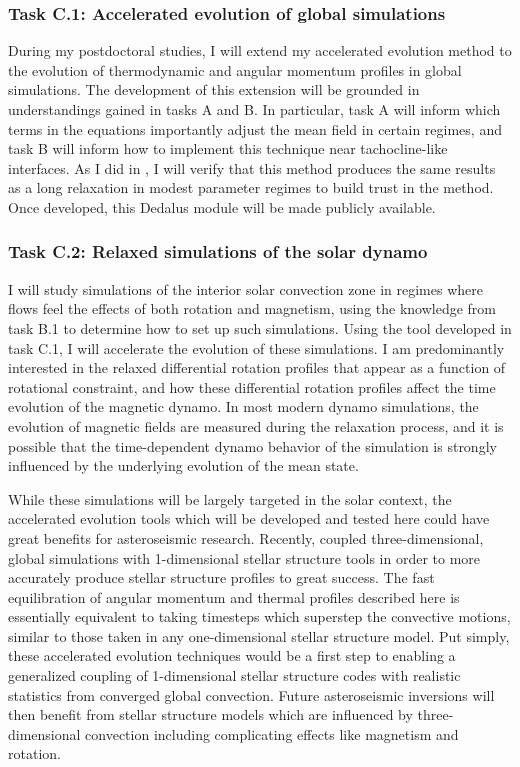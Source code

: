 \documentclass[aasms,11pt]{article}
\begin{document}
\subsubsection{Task C.1: Accelerated evolution of global simulations}
\label{sct:taskC1}
During my postdoctoral studies, I will extend my accelerated evolution method to the evolution of thermodynamic and angular momentum profiles in global simulations.
The development of this extension will be grounded in understandings gained in tasks A and B.
In particular, task A will inform which terms in the equations importantly adjust the mean field in certain regimes, and task B will inform how to implement this technique near tachocline-like interfaces.
As I did in \citet{anders&all2018}, I will verify that this method produces the same results as a long relaxation in modest parameter regimes to build trust in the method.
Once developed, this Dedalus module will be made publicly available.

\subsubsection{Task C.2: Relaxed simulations of the solar dynamo}
\label{sct:taskC2}
I will study simulations of the interior solar convection zone in regimes where flows feel the effects of both rotation and magnetism, using the knowledge from task B.1 to determine how to set up such simulations.
Using the tool developed in task C.1, I will accelerate the evolution of these simulations.
I am predominantly interested in the relaxed differential rotation profiles that appear as a function of rotational constraint, and how these differential rotation profiles affect the time evolution of the magnetic dynamo.
In most modern dynamo simulations, the evolution of magnetic fields are measured during the relaxation process, and it is possible that the time-dependent dynamo behavior of the simulation is strongly influenced by the underlying evolution of the mean state.

While these simulations will be largely targeted in the solar context, the accelerated evolution tools which will be developed and tested here could have great benefits for asteroseismic research.
Recently, \citet{jorgensen&weiss2019} coupled three-dimensional, global simulations with 1-dimensional stellar structure tools in order to more accurately produce stellar structure profiles to great success.
The fast equilibration of angular momentum and thermal profiles described here is essentially equivalent to taking timesteps which superstep the convective motions, similar to those taken in any one-dimensional stellar structure model.
Put simply, these accelerated evolution techniques would be a first step to enabling a generalized coupling of 1-dimensional stellar structure codes with realistic statistics from converged global convection.
Future asteroseismic inversions will then benefit from stellar structure models which are influenced by three-dimensional convection including complicating effects like magnetism and rotation.
\end{document}
